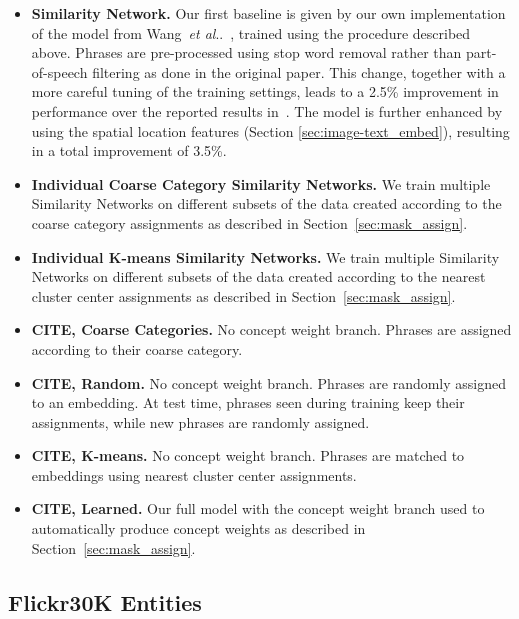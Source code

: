 \documentclass[runningheads]{llncs}
\makeatletter
\DeclareRobustCommand\onedot{\futurelet\@let@token\@onedot}
\def\@onedot{\ifx\@let@token.\else.\null\fi\xspace}
\def\etal{\emph{et al}\onedot}
\makeatother
\begin{document}
\begin{itemize}
\item {\bf Similarity Network.}  Our first baseline is given by our own implementation of the model from Wang~\etal~\cite{wangTwoBranch2017}, trained using the procedure described above. Phrases are pre-processed using stop word removal rather than part-of-speech filtering as done in the original paper.  This change, together with a more careful tuning of the training settings, leads to a 2.5\% improvement in performance over the reported results in~\cite{wangTwoBranch2017}.  The model is further enhanced by using the spatial location features (Section \ref{sec:image-text_embed}), resulting in a total improvement of 3.5\%.
\item {\bf Individual Coarse Category Similarity Networks.}  We train multiple Similarity Networks on different subsets of the data created according to the coarse category assignments as described in Section~\ref{sec:mask_assign}.
\item {\bf Individual K-means Similarity Networks.}  We train multiple Similarity Networks on different subsets of the data created according to the nearest cluster center assignments as described in Section~\ref{sec:mask_assign}.
\item {\bf CITE, Coarse Categories.} No concept weight branch. Phrases are assigned according to their coarse category.
\item {\bf CITE, Random.} No concept weight branch. Phrases are randomly assigned to an embedding.  At test time, phrases seen during training keep their assignments, while new phrases are randomly assigned.
\item {\bf CITE, K-means.}  No concept weight branch. Phrases are matched to embeddings using nearest cluster center assignments.
\item {\bf CITE, Learned.}  Our full model with the concept weight branch used to automatically produce concept weights as described in Section~\ref{sec:mask_assign}.
\end{itemize}\subsection{Flickr30K Entities}\label{sec:flickr}\begin{table}[t]
  \centering
  \caption{Phrase localization performance on the Flickr30k Entities test set. (a) State-of-the-art results when predicting a single phrase at a time taken from published works. %
}
\end{table}
\end{document}
